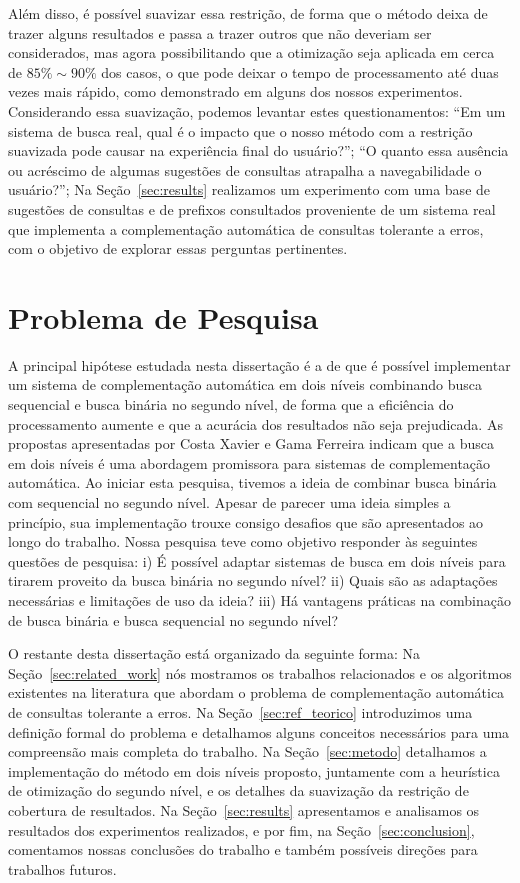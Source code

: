 Além disso, é possível suavizar essa restrição, de forma que o método deixa de trazer alguns resultados e passa a trazer outros que não deveriam ser considerados, mas agora possibilitando que a otimização seja aplicada em cerca de $85\%\sim90\%$ dos casos, o que pode deixar o tempo de processamento até duas vezes mais rápido, como demonstrado em alguns dos nossos experimentos. Considerando essa suavização, podemos levantar estes questionamentos: ``Em um sistema de busca real, qual é o impacto que o nosso método com a restrição suavizada pode causar na experiência final do usuário?''; ``O quanto essa ausência ou acréscimo de algumas sugestões de consultas atrapalha a navegabilidade o usuário?''; Na Seção~\ref{sec:results} realizamos um experimento com uma base de sugestões de consultas e de prefixos consultados proveniente de um sistema real que implementa a complementação automática de consultas tolerante a erros, com o objetivo de explorar essas perguntas pertinentes.

\section{Problema de Pesquisa}
\label{sec:research-problem}
A principal hipótese estudada nesta dissertação é a de que é possível implementar um sistema de complementação automática em dois níveis combinando busca sequencial e busca binária no segundo nível, de forma que a eficiência do processamento aumente e que a acurácia dos resultados não seja prejudicada. As propostas apresentadas por Costa Xavier e Gama Ferreira indicam que a busca em dois níveis é uma abordagem promissora para sistemas de complementação automática. Ao iniciar esta pesquisa, tivemos a ideia de combinar busca binária com sequencial no segundo nível. Apesar de parecer uma ideia simples a princípio, sua implementação trouxe consigo desafios que são apresentados ao longo do trabalho. Nossa pesquisa teve como objetivo responder às seguintes questões de pesquisa: i) É possível adaptar sistemas de busca em dois níveis para tirarem proveito da busca binária no segundo nível? ii) Quais são as adaptações necessárias e limitações de uso da ideia? iii) Há vantagens práticas na combinação de busca binária e busca sequencial no segundo nível?


O restante desta dissertação está organizado da seguinte forma: Na Seção~\ref{sec:related_work} nós mostramos os trabalhos relacionados e os algoritmos existentes na literatura que abordam o problema de complementação automática de consultas tolerante a erros. Na Seção~\ref{sec:ref_teorico} introduzimos uma definição formal do problema e detalhamos alguns conceitos necessários para uma compreensão mais completa do trabalho. Na Seção~\ref{sec:metodo} detalhamos a implementação do método em dois níveis proposto, juntamente com a heurística de otimização do segundo nível, e os detalhes da suavização da restrição de cobertura de resultados. Na Seção~\ref{sec:results} apresentamos e analisamos os resultados dos experimentos realizados, e por fim, na Seção~\ref{sec:conclusion}, comentamos nossas conclusões do trabalho e também possíveis direções para trabalhos futuros.
